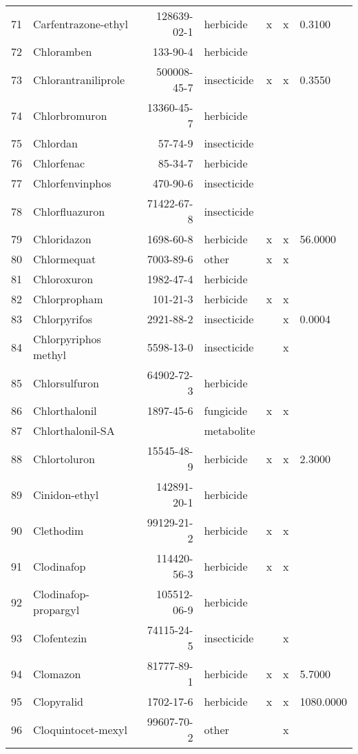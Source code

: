 \begin{longtable}{lp{4cm}rlp{1.3cm}p{1.3cm}p{1.5cm}}
  71 & Carfentrazone-ethyl & 128639-02-1 & herbicide & x & x & 0.3100 \\ 
  72 & Chloramben & 133-90-4 & herbicide &  &  &  \\ 
  73 & Chlorantraniliprole & 500008-45-7 & insecticide & x & x & 0.3550 \\ 
  74 & Chlorbromuron & 13360-45-7 & herbicide &  &  &  \\ 
  75 & Chlordan & 57-74-9 & insecticide &  &  &  \\ 
  76 & Chlorfenac & 85-34-7 & herbicide &  &  &  \\ 
  77 & Chlorfenvinphos & 470-90-6 & insecticide &  &  &  \\ 
  78 & Chlorfluazuron & 71422-67-8 & insecticide &  &  &  \\ 
  79 & Chloridazon & 1698-60-8 & herbicide & x & x & 56.0000 \\ 
  80 & Chlormequat & 7003-89-6 & other & x & x &  \\ 
  81 & Chloroxuron & 1982-47-4 & herbicide &  &  &  \\ 
  82 & Chlorpropham & 101-21-3 & herbicide & x & x &  \\ 
  83 & Chlorpyrifos & 2921-88-2 & insecticide &  & x & 0.0004 \\ 
  84 & Chlorpyriphos methyl & 5598-13-0 & insecticide &  & x &  \\ 
  85 & Chlorsulfuron & 64902-72-3 & herbicide &  &  &  \\ 
  86 & Chlorthalonil & 1897-45-6 & fungicide & x & x &  \\ 
  87 & Chlorthalonil-SA &  & metabolite &  &  &  \\ 
  88 & Chlortoluron & 15545-48-9 & herbicide & x & x & 2.3000 \\ 
  89 & Cinidon-ethyl & 142891-20-1 & herbicide &  &  &  \\ 
  90 & Clethodim & 99129-21-2 & herbicide & x & x &  \\ 
  91 & Clodinafop & 114420-56-3 & herbicide & x & x &  \\ 
  92 & Clodinafop-propargyl & 105512-06-9 & herbicide &  &  &  \\ 
  93 & Clofentezin & 74115-24-5 & insecticide &  & x &  \\ 
  94 & Clomazon & 81777-89-1 & herbicide & x & x & 5.7000 \\ 
  95 & Clopyralid & 1702-17-6 & herbicide & x & x & 1080.0000 \\ 
  96 & Cloquintocet-mexyl & 99607-70-2 & other &  & x &  \\ 

\end{longtable}
